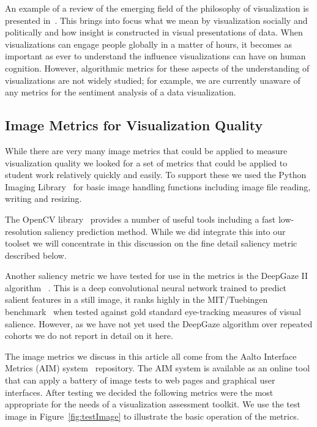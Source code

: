 An example of a review of the emerging field of the philosophy of visualization is presented in~\cite{Engebretsen2020}. This brings into focus what we mean by visualization socially and politically and how insight is constructed in visual presentations of data. When visualizations can engage people globally in a matter of hours, it becomes as important as ever to understand the influence visualizations can have on human cognition. However, algorithmic metrics for these aspects of the understanding of visualizations are not widely studied; for example, we are currently unaware of any metrics for the sentiment analysis of a data visualization. 

\subsection{Image Metrics for Visualization Quality}

While there are very many image metrics that could be applied to measure visualization quality we looked for a set of metrics that could be applied to student work relatively quickly and easily. To support these we used the Python Imaging Library~\cite{pillow} for basic image handling functions including image file reading, writing and resizing.

The OpenCV library~\cite{opencv2008} provides a number of useful tools including a fast low-resolution saliency prediction method. While we did integrate this into our toolset we will concentrate in this discussion on the fine detail saliency metric described below. 

Another saliency metric we have tested for use in the metrics is the DeepGaze II algorithm ~\cite{Kummerer_2017_ICCV}. This is a deep convolutional neural network trained to predict salient features in a still image, it ranks highly in the MIT/Tuebingen benchmark~\cite{mit-tuebingen-saliency-benchmark} when tested against gold standard eye-tracking measures of visual salience. However, as we have not yet used the DeepGaze algorithm over repeated cohorts we do not report in detail on it here.

The image metrics we discuss in this article all come from the Aalto Interface Metrics ({AIM}) system~\cite{Oulasvirta:2018} repository. The AIM system is available as an online tool that can apply a battery of image tests to web pages and graphical user interfaces. After testing we decided the following metrics were the most appropriate for the needs of a visualization assessment toolkit. We use the test image in Figure~\ref{fig:testImage} to illustrate the basic operation of the metrics.

